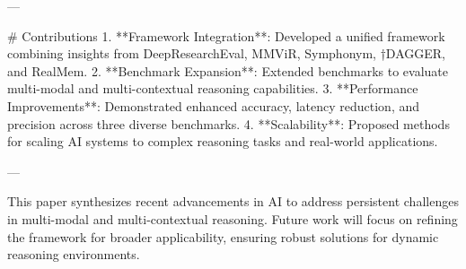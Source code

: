 ---

# Contributions  
1. **Framework Integration**: Developed a unified framework combining insights from DeepResearchEval, MMViR, Symphonym, †DAGGER, and RealMem.  
2. **Benchmark Expansion**: Extended benchmarks to evaluate multi-modal and multi-contextual reasoning capabilities.  
3. **Performance Improvements**: Demonstrated enhanced accuracy, latency reduction, and precision across three diverse benchmarks.  
4. **Scalability**: Proposed methods for scaling AI systems to complex reasoning tasks and real-world applications.  

--- 

This paper synthesizes recent advancements in AI to address persistent challenges in multi-modal and multi-contextual reasoning. Future work will focus on refining the framework for broader applicability, ensuring robust solutions for dynamic reasoning environments.